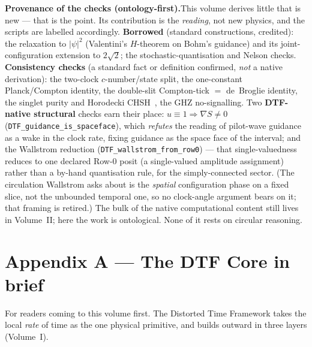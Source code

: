 \documentclass[11pt]{article}
\begin{document}
\medskip
{}

\begin{tcolorbox}[keybox]
\textbf{Provenance of the checks (ontology-first).}\enspace This volume derives little that is new ---
that is the point. Its contribution is the \emph{reading}, not new physics, and the scripts are labelled
accordingly. \textbf{Borrowed} (standard constructions, credited): the relaxation to $|\psi|^2$
(Valentini's $H$-theorem on Bohm's guidance) and its joint-configuration extension to $2\sqrt2$; the
stochastic-quantisation and Nelson checks. \textbf{Consistency checks} (a standard fact or definition
confirmed, \emph{not} a native derivation): the two-clock $c$-number/state split, the one-constant
Planck/Compton identity, the double-slit Compton-tick $=$ de~Broglie identity, the singlet purity and
Horodecki CHSH~\cite{Horodecki1995}, the GHZ no-signalling. Two \textbf{DTF-native structural} checks
earn their place: $u\equiv1\Rightarrow\nabla S\neq0$ (\texttt{DTF\_guidance\_is\_spaceface}), which
\emph{refutes} the reading of pilot-wave guidance as a wake in the clock rate, fixing guidance as the
space face of the interval; and the Wallstrom reduction
(\texttt{DTF\_wallstrom\_from\_row0}) --- that single-valuedness reduces to one declared Row-0 posit (a
single-valued amplitude assignment) rather than a by-hand quantisation rule, for the simply-connected
sector. (The circulation Wallstrom asks about is the \emph{spatial} configuration phase on a fixed slice,
not the unbounded temporal one, so no clock-angle argument bears on it; that framing is retired.) The bulk of the native computational content still lives in Volume~II; here the work is
ontological. None of it rests on circular reasoning.
\end{tcolorbox}

\appendix
\section*{Appendix A --- The DTF Core in brief}
\noindent For readers coming to this volume first. The Distorted Time Framework takes the local
\emph{rate} of time as the one physical primitive, and builds outward in three layers (Volume~I).
\end{document}
